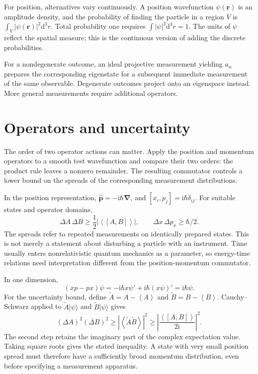 \documentclass[11pt,oneside]{book}
\newcommand{\dd}{\mathrm{d}}
\newcommand{\ii}{\mathrm{i}}
\newcommand{\vect}[1]{\boldsymbol{#1}}
\newcommand{\grad}{\boldsymbol{\nabla}}
\newcommand{\avg}[1]{\left\langle #1\right\rangle}
\newcommand{\ket}[1]{\lvert #1\rangle}
\theoremstyle{reviewstyle}
\begin{document}
For position, alternatives vary continuously. A position wavefunction $\psi(\vect r)$ is an amplitude density, and the probability of finding the particle in a region $V$ is $\int_V|\psi(\vect r)|^2\dd^3r$. Total probability one requires $\int|\psi|^2\dd^3r=1$. The units of $\psi$ reflect the spatial measure; this is the continuous version of adding the discrete probabilities.

For a nondegenerate outcome, an ideal projective measurement yielding $a_n$ prepares the corresponding eigenstate for a subsequent immediate measurement of the same observable. Degenerate outcomes project onto an eigenspace instead. More general measurements require additional operators.

\section{Operators and uncertainty}
The order of two operator actions can matter. Apply the position and momentum operators to a smooth test wavefunction and compare their two orders: the product rule leaves a nonzero remainder. The resulting commutator controls a lower bound on the spreads of the corresponding measurement distributions.

In the position representation, $\hat{\vect p}=-\ii\hbar\grad$, and $[x_i,p_j]=\ii\hbar\delta_{ij}$. For suitable states and operator domains,
\begin{equation}\Delta A\,\Delta B\geq\frac12|\avg{[A,B]}|,\qquad \Delta x\,\Delta p_x\geq\hbar/2.\end{equation}
The spreads refer to repeated measurements on identically prepared states. This is not merely a statement about disturbing a particle with an instrument. Time usually enters nonrelativistic quantum mechanics as a parameter, so energy-time relations need interpretation different from the position-momentum commutator.

In one dimension,
\begin{equation}
(xp-px)\psi=-\ii\hbar x\psi'+\ii\hbar(x\psi)'
=\ii\hbar\psi.
\end{equation}
For the uncertainty bound, define $\widetilde A=A-\avg A$ and $\widetilde B=B-\avg B$. Cauchy--Schwarz applied to $\widetilde A\ket\psi$ and $\widetilde B\ket\psi$ gives
\begin{equation}
(\Delta A)^2(\Delta B)^2\geq
|\avg{\widetilde A\widetilde B}|^2
\geq\left|\frac{\avg{[A,B]}}{2\ii}\right|^2.
\end{equation}
The second step retains the imaginary part of the complex expectation value. Taking square roots gives the stated inequality. A state with very small position spread must therefore have a sufficiently broad momentum distribution, even before specifying a measurement apparatus.
\end{document}
